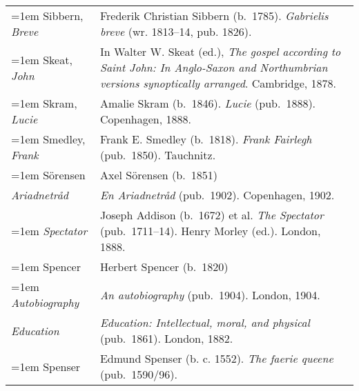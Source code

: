 \begin{xltabular}{\textwidth}{ lQ }
\hangindent=1em  Sibbern, \textit{Breve} & Frederik Christian Sibbern (b.~1785). \textit{Gabrielis breve} (wr. 1813--14, pub. 1826). \\

\hangindent=1em  Skeat, \textit{John} & In Walter W. Skeat (ed.), \textit{The gospel according to Saint John: In Anglo-Saxon and Northumbrian versions synoptically arranged}. Cambridge, 1878. \\ %

\hangindent=1em  Skram, \textit{Lucie} & Amalie Skram (b.~1846). \textit{Lucie} (pub.~1888). Copenhagen, 1888. \\

\hangindent=1em  Smedley, \textit{Frank} & Frank E. Smedley (b.~1818). \textit{Frank Fairlegh} (pub.~1850). Tauchnitz. \\

\hangindent=1em  Sörensen & Axel Sörensen (b.~1851)\\
\hspace{1em}\textit{Ariadnetråd} & \textit{En Ariadnetråd} (pub.~1902). Copenhagen, 1902.  \\ %

\hangindent=1em  \textit{Spectator} & Joseph Addison (b.~1672) et al. \textit{The Spectator} (pub.~1711--14). Henry Morley (ed.). London, 1888. \\ %

\hangindent=1em  Spencer & Herbert Spencer (b.~1820) \\
\hspace{1em}\hangindent=1em  \textit{Autobiography} & \textit{An autobiography} (pub.~1904). London, 1904. \\
\hspace{1em}\textit{Education} & \textit{Education: Intellectual, moral, and physical} (pub.~1861). London, 1882. \\ %

\hangindent=1em  Spenser & Edmund Spenser (b. c. 1552). \textit{The faerie queene} (pub.~1590/96). \\ %


\end{xltabular}
